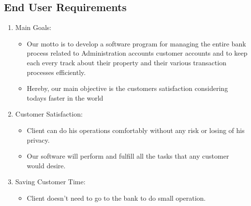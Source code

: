 \subsection{End User Requirements}
\begin{enumerate}
\item Main Goals:
	\begin{itemize}
	\item Our motto is to develop a software program for managing the entire bank process
related to Administration accounts customer accounts and to keep each every track about
their property and their various transaction processes efficiently.
	\item Hereby, our main objective is the customers satisfaction considering todays faster in
the world
	\end{itemize}
\item Customer Satisfaction:
	\begin{itemize}
	\item Client can do his operations comfortably without any risk or losing of his privacy.
	\item Our software will perform and fulfill all the tasks that any customer would desire.
	\end{itemize}		
\item Saving Customer Time:
	\begin{itemize}
	\item Client doesn't need to go to the bank to do small operation.	\end{itemize}
\end{enumerate}
\thispagestyle{fancy}

